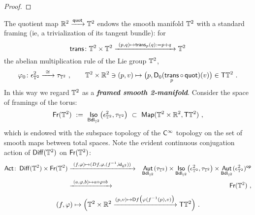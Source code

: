 \documentclass{amsart}
\theoremstyle{definition}
\theoremstyle{remark}
\DeclareMathOperator{\Aut}{\sf Aut}
\DeclareMathOperator{\Iso}{\sf Iso}
\DeclareMathOperator{\Map}{{\sf Map}}
\DeclareMathOperator{\Diff}{{\sf Diff}}
\DeclareMathOperator{\op}{\mathsf{op}}
\DeclareMathOperator{\Emb}{\mathsf{Emb}}
\newcommand{\xra}{\xrightarrow}
\def\II{\mathbb I}\def\JJ{\mathbb J}\def\KK{\mathbb K}\def\LL{\mathbb L}
\DeclareMathOperator{\quot}{\sf quot}
\DeclareMathOperator{\Fr}{\sf Fr}
\DeclareMathOperator{\id}{\sf id}
\DeclareMathOperator{\Act}{\sf Act}
\DeclareMathOperator{\trans}{\sf trans}
\DeclareMathOperator{\Bdl}{\sf Bdl}
\begin{document}
\begin{proof}
\end{proof}


The quotient map $\RR^2\xra{\quot}\TT^2$ endows the smooth manifold $\mathbb T^2$ with a standard framing (ie, a trivialization of its tangent bundle): 
for 
\[
\trans\colon \TT^2 \times \TT^2 
\xra{~(p,q)\mapsto \trans_p(q) := p+q~} 
\TT^2
\]
the abelian multiplication rule of the Lie group $\mathbb T^2$, 
\begin{equation}
\label{e5}
\varphi_0
\colon
\epsilon^2_{\TT^2}
\xra{~\cong~}
\tau_{\TT^2}
~,\qquad
\TT^2 \times \RR^2 \ni (p,v)
\mapsto
\bigl(p,\sD_{0}(\trans_p \circ \quot) (v) \bigr)
\in \sT \TT^2
~.
\end{equation}
In this way we regard $\mathbb T^2$ as a \textit{\textbf{framed smooth 2-manifold}}.
Consider the space of framings of the torus:
\[
\Fr(\TT^2)
~:=~
\Iso_{\Bdl_{\TT^2}}\bigl( \epsilon^2_{\TT^2} , \tau_{\TT^2} \bigr)
~\subset~
\Map(\TT^2 \times \RR^2 , \sT \TT^2 )
~,
\]
which is endowed with the subspace topology of the $\mathsf C^\infty$ topology on the set of smooth maps between total spaces.  
Note the evident continuous conjugation action of $\Diff(\TT^2)$ on $\Fr(\TT^2)$:
\begin{eqnarray}
\nonumber
\Act\colon
\Diff(\TT^2)\times \Fr(\TT^2)
&
\xra{~(f,\varphi)\mapsto (Df , \varphi , (f^{-1} , \id_{\RR^2}))~}
&
\Aut_{\Bdl_{\TT^2}}(\tau_{\TT^2})
\times 
\Iso_{\Bdl_{\TT^2}}\bigl( \epsilon^2_{\TT^2} , \tau_{\TT^2} \bigr)
\times
\Aut_{\Bdl_{\TT^2}}(\epsilon^2_{\TT^2})^{\op}
\\
\label{e9}
&
\xra{~(a,\varphi , b )\mapsto a \circ \varphi \circ b~}
&
\Fr(\TT^2)
~,
\end{eqnarray}
\[
(f,\varphi)
\mapsto 
\Bigl(
\TT^2 \times \RR^2 \xra{(p,v)\mapsto \sD f \bigl( \varphi(f^{-1}(p),v) \bigr)  }
\sT \TT^2
\Bigr)
~.
\]
\end{document}
